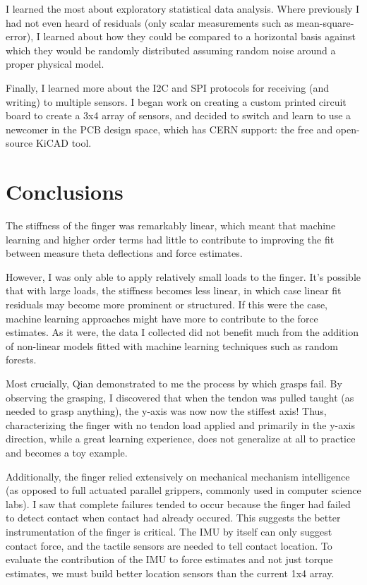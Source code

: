 \documentclass[12pt]{article}
\begin{document}
I learned the most about exploratory statistical data analysis. Where previously I had not even
heard of residuals (only scalar measurements such as mean-square-error), I learned about how they
could be compared to a horizontal basis against which they would be randomly distributed assuming
random noise around a proper physical model.

Finally, I learned more about the I2C and SPI protocols for receiving (and writing) to multiple
sensors. I began work on creating a custom printed circuit board to create a 3x4 array of sensors,
and decided to switch and learn to use a newcomer in the PCB design space, which has CERN support: the free and open-source
KiCAD tool.

\section{Conclusions}

The stiffness of the finger was remarkably linear, which meant that machine learning and higher
order terms had little to contribute to improving the fit between measure theta deflections and
force estimates.

However, I was only able to apply relatively small loads to the finger. It's possible that with
large loads, the stiffness becomes less linear, in which case linear fit residuals may become more
prominent or structured. If this were the case, machine learning approaches might have more to
contribute to the force estimates. As it were, the data I collected did not benefit much from the
addition of non-linear models fitted with machine learning techniques such as random forests.

Most crucially, Qian demonstrated to me the process by which grasps fail. By observing the grasping,
I discovered that when the tendon was pulled taught (as needed to grasp anything), the y-axis was now
now the stiffest axis! Thus, characterizing the finger with no tendon load applied and primarily in
the y-axis direction, while a great learning experience, does not generalize at all to practice and becomes a
toy example.

Additionally, the finger relied extensively on mechanical mechanism intelligence (as opposed to full
actuated parallel grippers, commonly used in computer science labs).  I saw that complete failures
tended to occur because the finger had failed to detect contact when contact had already occured.
This suggests the better instrumentation of the finger is critical. The IMU by itself can only
suggest contact force, and the tactile sensors are needed to tell contact location. To evaluate the
contribution of the IMU to force estimates and not just torque estimates, we must build better
location sensors than the current 1x4 array.
\end{document}
